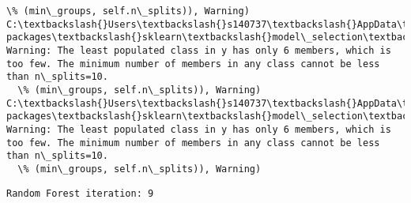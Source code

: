\documentclass[11pt]{article}
\begin{document}
\begin{Verbatim}[commandchars=\\\{\}]
  \% (min\_groups, self.n\_splits)), Warning)
C:\textbackslash{}Users\textbackslash{}s140737\textbackslash{}AppData\textbackslash{}Local\textbackslash{}Continuum\textbackslash{}anaconda3\textbackslash{}lib\textbackslash{}site-packages\textbackslash{}sklearn\textbackslash{}model\_selection\textbackslash{}\_split.py:605: Warning: The least populated class in y has only 6 members, which is too few. The minimum number of members in any class cannot be less than n\_splits=10.
  \% (min\_groups, self.n\_splits)), Warning)
C:\textbackslash{}Users\textbackslash{}s140737\textbackslash{}AppData\textbackslash{}Local\textbackslash{}Continuum\textbackslash{}anaconda3\textbackslash{}lib\textbackslash{}site-packages\textbackslash{}sklearn\textbackslash{}model\_selection\textbackslash{}\_split.py:605: Warning: The least populated class in y has only 6 members, which is too few. The minimum number of members in any class cannot be less than n\_splits=10.
  \% (min\_groups, self.n\_splits)), Warning)

    \end{Verbatim}

    \begin{Verbatim}[commandchars=\\\{\}]
Random Forest iteration: 9 

    \end{Verbatim}
\end{document}
